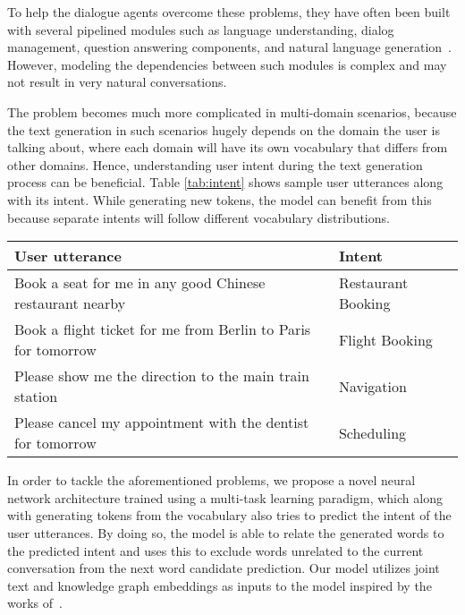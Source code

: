 \documentclass[runningheads]{llncs}
\begin{document}
To help the dialogue agents overcome these problems, they have often been built with several pipelined modules such as language understanding, dialog management, question answering components, and natural language generation~\cite{P18-1136}. However, modeling the dependencies between such modules is complex and may not result in very natural conversations.


The problem becomes much more complicated in multi-domain scenarios, because the text generation in such scenarios hugely depends on the domain the user is talking about, where each domain will have its own vocabulary that differs from other domains. Hence, understanding user intent during the text generation process can be beneficial. Table \ref{tab:intent} shows sample user utterances along with its intent. While generating new tokens, the model can benefit from this because separate intents will follow different vocabulary distributions.

\begin{table*}[ht]
\caption{User query and respective intents}
     \begin{tabular}{ l | l}
     \toprule
     \textbf{User utterance} & \textbf{Intent}\\
    \hline
     Book a seat for me in any good Chinese restaurant nearby &	Restaurant Booking \\
     Book a flight ticket for me from Berlin to Paris for tomorrow	& Flight Booking \\
     Please show me the direction to the main train station & Navigation \\
     Please cancel my appointment with the dentist for tomorrow & Scheduling \\
     \bottomrule
    \end{tabular}
 \vspace{0.1cm}
    \label{tab:intent}
\end{table*}

In order to tackle the aforementioned problems, we propose a novel neural network architecture trained using a multi-task learning paradigm, which along with generating tokens from the vocabulary also tries to predict the intent of the user utterances. By doing so, the model is able to relate the generated words to the predicted intent and uses this to exclude words unrelated to the current conversation from the next word candidate prediction. Our model utilizes joint text and knowledge graph embeddings as inputs to the model inspired by the works of~\cite{Alsuhaibani2018}.
\end{document}
